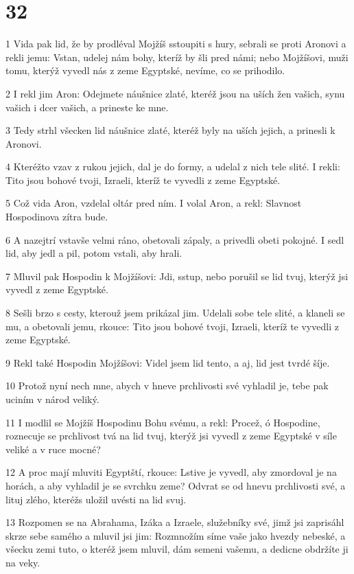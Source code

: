 \chapter{32}

\par 1 Vida pak lid, že by prodléval Mojžíš sstoupiti s hury, sebrali se proti Aronovi a rekli jemu: Vstan, udelej nám bohy, kteríž by šli pred námi; nebo Mojžíšovi, muži tomu, kterýž vyvedl nás z zeme Egyptské, nevíme, co se prihodilo.
\par 2 I rekl jim Aron: Odejmete náušnice zlaté, kteréž jsou na uších žen vašich, synu vašich i dcer vašich, a prineste ke mne.
\par 3 Tedy strhl všecken lid náušnice zlaté, kteréž byly na uších jejich, a prinesli k Aronovi.
\par 4 Kteréžto vzav z rukou jejich, dal je do formy, a udelal z nich tele slité. I rekli: Tito jsou bohové tvoji, Izraeli, kteríž te vyvedli z zeme Egyptské.
\par 5 Což vida Aron, vzdelal oltár pred ním. I volal Aron, a rekl: Slavnost Hospodinova zítra bude.
\par 6 A nazejtrí vstavše velmi ráno, obetovali zápaly, a privedli obeti pokojné. I sedl lid, aby jedl a pil, potom vstali, aby hrali.
\par 7 Mluvil pak Hospodin k Mojžíšovi: Jdi, sstup, nebo porušil se lid tvuj, kterýž jsi vyvedl z zeme Egyptské.
\par 8 Sešli brzo s cesty, kterouž jsem prikázal jim. Udelali sobe tele slité, a klaneli se mu, a obetovali jemu, rkouce: Tito jsou bohové tvoji, Izraeli, kteríž te vyvedli z zeme Egyptské.
\par 9 Rekl také Hospodin Mojžíšovi: Videl jsem lid tento, a aj, lid jest tvrdé šíje.
\par 10 Protož nyní nech mne, abych v hneve prchlivosti své vyhladil je, tebe pak uciním v národ veliký.
\par 11 I modlil se Mojžíš Hospodinu Bohu svému, a rekl: Procež, ó Hospodine, roznecuje se prchlivost tvá na lid tvuj, kterýž jsi vyvedl z zeme Egyptské v síle veliké a v ruce mocné?
\par 12 A proc mají mluviti Egyptští, rkouce: Lstive je vyvedl, aby zmordoval je na horách, a aby vyhladil je se svrchku zeme? Odvrat se od hnevu prchlivosti své, a lituj zlého, kteréžs uložil uvésti na lid svuj.
\par 13 Rozpomen se na Abrahama, Izáka a Izraele, služebníky své, jimž jsi zaprisáhl skrze sebe samého a mluvil jsi jim: Rozmnožím síme vaše jako hvezdy nebeské, a všecku zemi tuto, o kteréž jsem mluvil, dám semeni vašemu, a dedicne obdržíte ji na veky.
